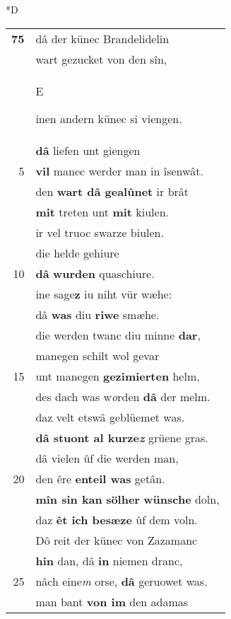 \documentclass[8pt,a4paper,notitlepage]{article}
\begin{document}
\begin{table}[ht]
\begin{minipage}[t]{0.5\linewidth}
\small
\begin{center}*D
\end{center}
\begin{tabular}{rl}
\textbf{75} & dâ der künec Brandelidelin\\ 
 & wart gezucket von den sîn,\\ 
 & \begin{large}E\end{large}inen andern künec si viengen.\\ 
 & \textbf{dâ} liefen unt giengen\\ 
5 & \textbf{vil} manec werder man in îsenwât.\\ 
 & den \textbf{wart dâ gealûnet} ir brât\\ 
 & \textbf{mit} treten unt \textbf{mit} kiulen.\\ 
 & ir vel truoc swarze biulen.\\ 
 & die helde gehiure\\ 
10 & \textbf{dâ} \textbf{wurden} quaschiure.\\ 
 & ine sage\textbf{z} iu niht vür wæhe:\\ 
 & dâ \textbf{was} diu \textbf{riwe} smæhe.\\ 
 & die werden twanc diu minne \textbf{dar},\\ 
 & manegen schilt wol gevar\\ 
15 & unt manegen \textbf{gezimierten} helm,\\ 
 & des dach was w\textit{o}rden \textbf{dâ} der melm.\\ 
 & daz velt etswâ geblüemet was.\\ 
 & \textbf{dâ stuont al kurze\textit{z}} grüene gras.\\ 
 & dâ vielen ûf die werden man,\\ 
20 & den êre \textbf{enteil was} getân.\\ 
 & \textbf{mîn sin kan} \textbf{sölher} \textbf{wünsche} doln,\\ 
 & daz \textbf{êt ich besæze} ûf dem voln.\\ 
 & Dô reit der künec von Zazamanc\\ 
 & \textbf{hin} dan, dâ \textbf{in} niemen dranc,\\ 
25 & nâch eine\textit{m} orse, \textbf{dâ} geruowet was.\\ 
 & man bant \textbf{von im} den adamas\\ 

\end{tabular}
\end{minipage}
\end{table}
\end{document}
